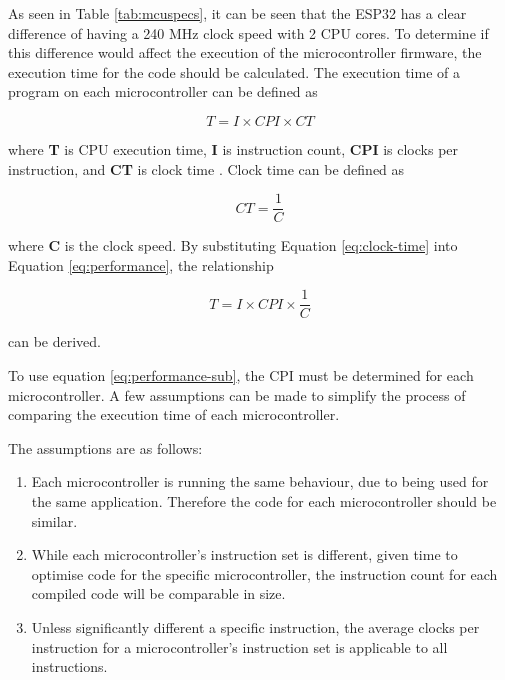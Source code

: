\documentclass[12pt, titlepage]{article}
\begin{document}
As seen in Table \ref{tab:mcuspecs}, it can be seen that the ESP32 has a clear difference of having a 240 MHz clock speed with 2 CPU cores. To determine if this difference would affect the execution of the microcontroller firmware, the execution time for the code should be calculated. The execution time of a program on each microcontroller can be defined as

\begin{equation}
    T = I \times CPI \times CT
    \label{eq:performance}
\end{equation}

where \textbf{T} is CPU execution time, \textbf{I} is instruction count, \textbf{CPI} is clocks per instruction, and \textbf{CT} is clock time \cite{perfeq}. Clock time can be defined as

\begin{equation}
    CT = \frac{1}{C}
    \label{eq:clock-time}
\end{equation}

where \textbf{C} is the clock speed. By substituting Equation \ref{eq:clock-time} into Equation \ref{eq:performance}, the relationship

\begin{equation}
    T = I \times CPI \times \frac{1}{C}
    \label{eq:performance-sub}
\end{equation}

can be derived.

To use equation \ref{eq:performance-sub}, the CPI must be determined for each microcontroller. A few assumptions can be made to simplify the process of comparing the execution time of each microcontroller. 

The assumptions are as follows:

\begin{enumerate}
    \item Each microcontroller is running the same behaviour, due to being used for the same application. Therefore the code for each microcontroller should be similar.
    \item While each microcontroller's instruction set is different, given time to optimise code for the specific microcontroller, the instruction count for each compiled code will be comparable in size.
    \item Unless significantly different a specific instruction, the average clocks per instruction for a microcontroller's instruction set is applicable to all instructions.
\end{enumerate}
\end{document}
